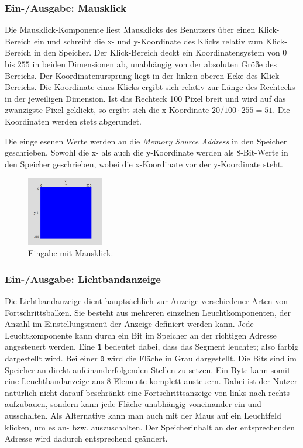 \subsubsection{Ein-/Ausgabe: Mausklick}

Die Mausklick-Komponente liest Mausklicks des Benutzers über einen Klick-Bereich
ein und schreibt die x- und y-Koordinate des Klicks relativ zum Klick-Bereich in
den Speicher. Der Klick-Bereich deckt ein Koordinatensystem von $0$ bis $255$ in
beiden Dimensionen ab, unabhängig von der absoluten Größe des Bereichs. Der
Koordinatenursprung liegt in der linken oberen Ecke des Klick-Bereichs. Die
Koordinate eines Klicks ergibt sich relativ zur Länge des Rechtecks in der
jeweiligen Dimension. Ist das Rechteck 100 Pixel breit und wird auf das
zwanzigste Pixel geklickt, so ergibt sich die x-Koordinate $20 / 100 \cdot 255 =
51$. Die Koordinaten werden stets abgerundet.

Die eingelesenen Werte werden an die \emph{Memory Source Address} in den
Speicher geschrieben. Sowohl die x- als auch die y-Koordinate werden als
8-Bit-Werte in den Speicher geschrieben, wobei die x-Koordinate vor der
y-Koordinate steht.

\begin{figure}[ht]
	\centering
	\includegraphics[width=0.3\textwidth]{Images/MouseArea}
	\caption{Eingabe mit Mausklick.}
	\label{MouseArea}
\end{figure}

\subsubsection{Ein-/Ausgabe: Lichtbandanzeige}

Die Lichtbandanzeige dient hauptsächlich zur Anzeige verschiedener Arten von
Fortschrittsbalken. Sie besteht aus mehreren einzelnen Leuchtkomponenten, der
Anzahl im Einstellungsmenü der Anzeige definiert werden kann. Jede
Leuchtkomponente kann durch ein Bit im Speicher an der richtigen Adresse
angesteuert werden. Eine \texttt{1} bedeutet dabei, dass das Segment leuchtet;
also farbig dargestellt wird. Bei einer \texttt{0} wird die Fläche in Grau
dargestellt. Die Bits sind im Speicher an direkt aufeinanderfolgenden Stellen zu
setzen. Ein Byte kann somit eine Leuchtbandanzeige aus 8 Elemente komplett
ansteuern. Dabei ist der Nutzer natürlich nicht darauf beschränkt eine
Fortschrittsanzeige von links nach rechts aufzubauen, sondern kann jede Fläche
unabhängig voneinander ein und ausschalten. Als Alternative kann man auch mit
der Maus auf ein Leuchtfeld klicken, um es an- bzw. auszuschalten. Der
Speicherinhalt an der entsprechenden Adresse wird dadurch entsprechend
geändert.

